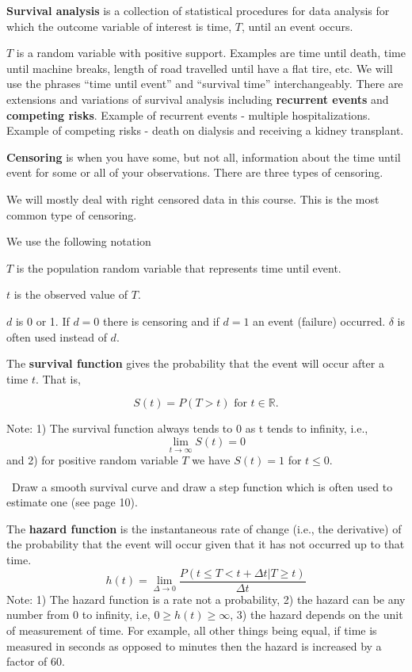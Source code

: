 \documentclass{article}
\begin{document}

 \textbf{Survival analysis} is a collection of statistical procedures for data analysis for which the outcome variable of interest is time, $T$, until an event occurs.

\bn
\im $T$ is a random variable with positive support. Examples are time until death, time until machine breaks, length of road travelled until have a flat tire, etc. We will use the phrases ``time until event'' and ``survival time'' interchangeably.
\im There are extensions and variations of survival analysis including \textbf{recurrent events} and \textbf{competing risks}.
\im Example of recurrent events - multiple hospitalizations. Example of competing risks - death on dialysis and receiving a kidney transplant.
\en

 \textbf{Censoring} is when you have some, but not all, information about the time until event for some or all of your observations. There are three types of censoring.

We will mostly deal with right censored data in this course. This is the most common type of censoring.


 We use the following notation
\bn
\item $T$ is the population random variable that represents time until event.
\item $t$ is the observed value of $T$.
\item $d$ is 0 or 1. If $d=0$ there is censoring and if $d=1$ an event (failure) occurred. $\delta$ is often used instead of $d$.
\en

 The \textbf{survival function} gives the probability that the event will occur after a time $t$. That is,

\[
S(t) = P(T>t) \text{ for } t \in \mathbb{R}.
\]

Note: 1) The survival function always tends to 0 as t tends to infinity, i.e.,
\[
\lim_{t\rightarrow\infty} S(t) = 0
\]
and 2) for positive random variable $T$ we have $S(t) = 1$ for $t \le 0$.

\NTS \, Draw a smooth survival curve and draw a step function which is often used to estimate one (see page 10).

 The \textbf{hazard function} is the instantaneous rate of change (i.e., the derivative) of the probability that the event will occur given that it has not occurred up to that time.
\[
h(t) = \lim_{\Delta \rightarrow 0} \frac{P(t \le T < t + \Delta t | T \ge t)}{\Delta t}
\]
Note: 1) The hazard function is a rate not a probability, 2) the hazard can be any number from 0 to infinity, i.e, $0\ge h(t) \ge \infty$, 3) the hazard depends on the unit of measurement of time. For example, all other things being equal, if time is measured in seconds as opposed to minutes then the hazard is increased by a factor of 60.
\end{document}
